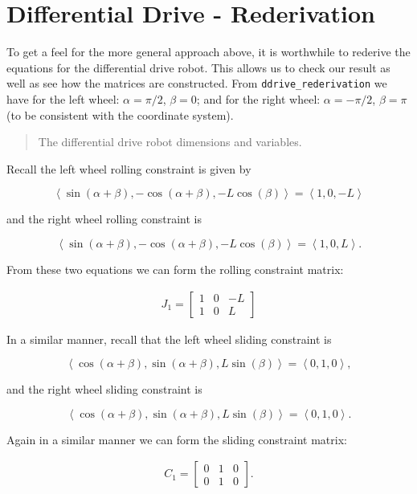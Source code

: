 \hypertarget{differential-drive---rederivation}{%
\section{Differential Drive -
Rederivation}\label{differential-drive---rederivation}}

To get a feel for the more general approach above, it is worthwhile to
rederive the equations for the differential drive robot. This allows us
to check our result as well as see how the matrices are constructed.
From \texttt{ddrive\_rederivation} we have for the left wheel:
\(\alpha = \pi/2\), \(\beta = 0\); and for the right wheel:
\(\alpha = -\pi/2\), \(\beta = \pi\) (to be consistent with the
coordinate system).

\begin{quote}
The differential drive robot dimensions and variables.
\end{quote}

Recall the left wheel rolling constraint is given by

\[\left\langle \sin(\alpha+\beta) , -\cos(\alpha+\beta), -L\cos(\beta) \right\rangle =
\left\langle 1 , 0, -L \right\rangle\]

and the right wheel rolling constraint is

\[\left\langle \sin(\alpha+\beta) , -\cos(\alpha+\beta), -L\cos(\beta) \right\rangle =
\left\langle 1 , 0, L \right\rangle .\]

From these two equations we can form the rolling constraint matrix:

\[\begin{aligned}
J_1 = \begin{bmatrix} 1 & 0 & -L \\ 1 & 0 & L \end{bmatrix}
\end{aligned}\]

In a similar manner, recall that the left wheel sliding constraint is

\[\left\langle \cos(\alpha+\beta) , \sin(\alpha+\beta), L\sin(\beta) \right\rangle =
\left\langle 0 , 1, 0 \right\rangle ,\]

and the right wheel sliding constraint is

\[\left\langle \cos(\alpha+\beta) , \sin(\alpha+\beta), L\sin(\beta) \right\rangle
= \left\langle 0 , 1, 0 \right\rangle  .\]

Again in a similar manner we can form the sliding constraint matrix:

\[\begin{aligned}
C_1 = \begin{bmatrix} 0 & 1 & 0 \\ 0 & 1 & 0 \end{bmatrix}.
\end{aligned}\]

